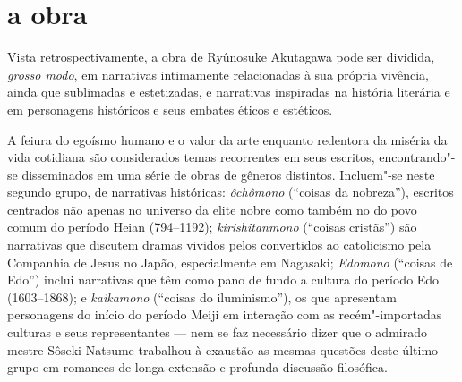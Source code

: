 \section*{a obra}
Vista retrospectivamente, a obra de Ryûnosuke Akutagawa  pode ser
dividida, \textit{grosso modo}, em narrativas intimamente relacionadas
à sua própria vivência, ainda que sublimadas e estetizadas, e
narrativas inspiradas na história literária e em personagens históricos
e seus embates éticos e estéticos.

A feiura do egoísmo humano e o valor da arte enquanto redentora da
miséria da vida cotidiana são considerados temas recorrentes em seus
escritos, encontrando"-se disseminados em uma série de obras de gêneros
distintos. Incluem"-se neste segundo grupo, de narrativas históricas:
\textit{ôchômono}  (``coisas da nobreza''), escritos centrados 
não apenas no universo da elite nobre como também no do povo
comum do período Heian (794--1192); \textit{kirishitanmono} 
(``coisas cristãs'') são narrativas que discutem dramas vividos pelos 
convertidos ao catolicismo pela Companhia de Jesus no Japão, especialmente
em Nagasaki; \textit{Edomono}  (``coisas de Edo'') inclui
narrativas que têm como pano de fundo a cultura do período Edo
(1603--1868); e \textit{kaikamono} (``coisas do iluminismo''), 
os que apresentam personagens do início do período Meiji em
interação com as recém"-importadas culturas e seus representantes --- nem
se faz necessário dizer que o admirado mestre Sôseki Natsume trabalhou
à exaustão as mesmas questões deste último grupo em romances de longa
extensão e profunda discussão filosófica.

